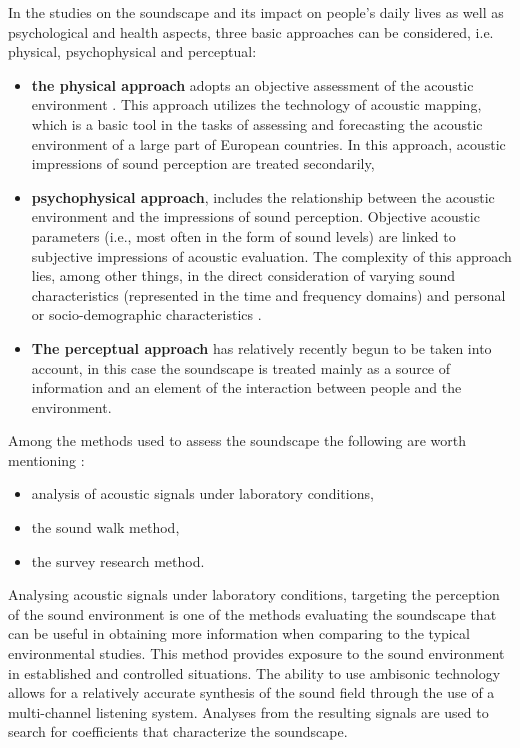 \documentclass[a4paper,10pt]{article}
\begin{document}
\begin{multicols}{2}
In the studies on the soundscape and its impact on people's daily lives as well
as psychological and health aspects, three basic approaches can be considered,
i.e. physical, psychophysical and perceptual:
\begin{itemize}
    \item \textbf{the physical approach} adopts an objective assessment of the acoustic
      environment \cite{Directive:2002/49}. This approach utilizes the technology of acoustic mapping,
    which is a basic tool in the tasks of assessing and forecasting the acoustic
    environment of a large part of European countries. In this approach,
    acoustic impressions of sound perception are treated secondarily,
    \item \textbf{psychophysical approach}, includes the relationship between the
    acoustic environment and the impressions of sound perception. Objective
    acoustic parameters (i.e., most often in the form of sound levels) are
    linked to subjective impressions of acoustic evaluation. The complexity of
    this approach lies, among other things, in the direct consideration of
    varying sound characteristics (represented in the time and frequency
    domains) and personal or socio-demographic
    characteristics \cite{Booteldooren:2006, Weinstein:1980}. 
    \item \textbf{The perceptual approach} has relatively recently begun to be taken into
    account, in this case the soundscape is treated mainly as a source of
    information and an element of the interaction between people and the
    environment.
\end{itemize}


Among the methods used to assess the soundscape the following are worth
mentioning \cite{Ozcevik:2008}: 
\begin{itemize}
    \item analysis of acoustic signals under laboratory conditions,
    \item the sound walk method,
    \item the survey research method.
\end{itemize}
Analysing acoustic signals under laboratory conditions, targeting the perception
of the sound environment is one of the methods evaluating the soundscape that
can be useful in obtaining more information when comparing to the typical
environmental studies. This method provides exposure to the sound environment in
established and controlled situations. The ability to use ambisonic technology
allows for a relatively accurate synthesis of the sound field through the use of
a multi-channel listening system. Analyses from the resulting signals are used
to search for coefficients that characterize the soundscape.


\end{multicols}
\end{document}
